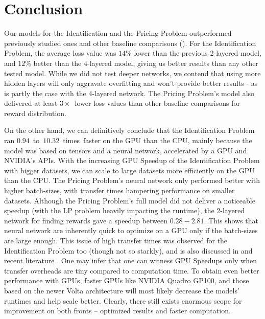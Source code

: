 \chapter{Conclusion} \label{sec:Conclusion}
Our models for the Identification and the Pricing Problem outperformed previously studied ones \cite{Xue2016Avi2} and other baseline comparisons (). For the Identification Problem, the average loss value was $14\%$ lower than the previous 2-layered model, and $12\%$ better than the 4-layered model, giving us better results than any other tested model. While we did not test deeper networks, we contend that using more hidden layers will only aggravate overfitting and won't provide better results - as is partly the case with the 4-layered network. The Pricing Problem's model also delivered at least $3\times$~lower loss values than other baseline comparisons for reward distribution.

On the other hand, we can definitively conclude that the Identification Problem ran $0.94$~to~$10.32$~times~faster on the GPU than the CPU, mainly because the model was based on tensors and a neural network, accelerated by a GPU and NVIDIA's APIs. With the increasing GPU Speedup of the Identification Problem with bigger datasets, we can scale to large datasets more efficiently on the GPU than the CPU. The Pricing Problem's neural network only performed better with higher batch-sizes, with transfer times hampering performance on smaller datasets. Although the Pricing Problem's full model did not deliver a noticeable speedup (with the LP problem heavily impacting the runtime), the 2-layered network for finding rewards gave a speedup between $0.28-2.81$. This shows that neural network are inherently quick to optimize on a GPU only if the batch-sizes are large enough. This issue of high transfer times was observed for the Identification Problem too (though not so starkly), and is also discussed in  and recent literature \cite[Appendix~B]{PattersonARM}. One may infer that one can witness GPU Speedups only when transfer overheads are tiny compared to computation time. To obtain even better performance with GPUs, faster GPUs like NVIDIA Quadro GP100, and those based on the newer Volta architecture will most likely decrease the models' runtimes and help scale better. Clearly, there still exists enormous scope for improvement on both fronts -- optimized results and faster computation.

